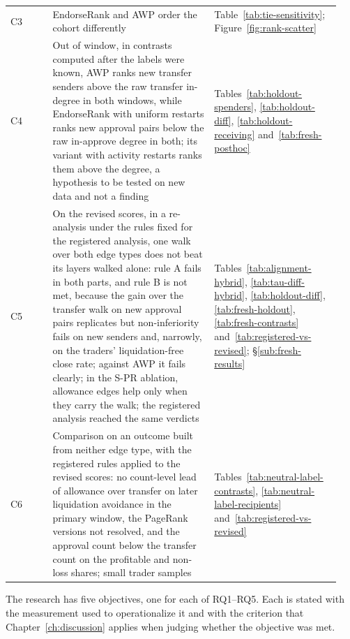 \begin{longtable}{p{0.12\linewidth}p{0.46\linewidth}p{0.36\linewidth}}
C3 & EndorseRank and AWP order the cohort differently & Table~\ref{tab:tie-sensitivity}; Figure~\ref{fig:rank-scatter} \\
C4 & Out of window, in contrasts computed after the labels were known, AWP ranks new transfer senders above the raw transfer in-degree in both windows, while EndorseRank with uniform restarts ranks new approval pairs below the raw in-approve degree in both; its variant with activity restarts ranks them above the degree, a hypothesis to be tested on new data and not a finding &Tables~\ref{tab:holdout-spenders}, \ref{tab:holdout-diff}, \ref{tab:holdout-receiving} and~\ref{tab:fresh-posthoc} \\
C5 & On the revised scores, in a re-analysis under the rules fixed for the registered analysis, one walk over both edge types does not beat its layers walked alone: rule A fails in both parts, and rule B is not met, because the gain over the transfer walk on new approval pairs replicates but non-inferiority fails on new senders and, narrowly, on the traders' liquidation-free close rate; against AWP it fails clearly; in the S-PR ablation, allowance edges help only when they carry the walk; the registered analysis reached the same verdicts &Tables~\ref{tab:alignment-hybrid}, \ref{tab:tau-diff-hybrid}, \ref{tab:holdout-diff}, \ref{tab:fresh-holdout}, \ref{tab:fresh-contrasts} and~\ref{tab:registered-vs-revised}; \S\ref{sub:fresh-results} \\
C6 & Comparison on an outcome built from neither edge type, with the registered rules applied to the revised scores: no count-level lead of allowance over transfer on later liquidation avoidance in the primary window, the PageRank versions not resolved, and the approval count below the transfer count on the profitable and non-loss shares; small trader samples & Tables~\ref{tab:neutral-label-contrasts}, \ref{tab:neutral-label-recipients} and~\ref{tab:registered-vs-revised} \\
\end{longtable}
\endgroup


The research has five objectives, one for each of RQ1--RQ5. Each is stated with the measurement used to operationalize it and with the criterion that Chapter~\ref{ch:discussion} applies when judging whether the objective was met.

